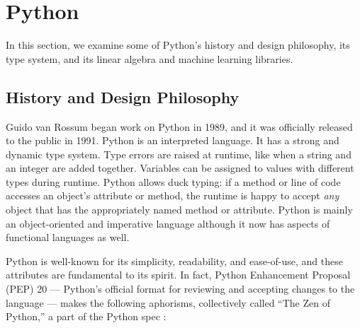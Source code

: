 \documentclass[12pt]{report}
\begin{document}
\section{Python}

In this section, we examine some of Python's history and design philosophy, its type system, and its linear algebra and machine learning libraries.

\subsection{History and Design Philosophy}

Guido van Rossum began work on Python in 1989, and it was officially released to the public in 1991. Python is an interpreted language. It has a strong and dynamic type system. Type errors are raised at runtime, like when a string and an integer are added together. Variables can be assigned to values with different types during runtime. Python allows duck typing: if a method or line of code accesses an object's attribute or method, the runtime is happy to accept \textit{any} object that has the appropriately named method or attribute. Python is mainly an object-oriented and imperative language although it now has aspects of functional languages as well.

Python is well-known for its simplicity, readability, and ease-of-use, and these attributes are fundamental to its spirit. In fact, Python Enhancement Proposal (PEP) 20 --- Python's official format for reviewing and accepting changes to the language --- makes the following aphorisms, collectively called ``The Zen of Python,'' a part of the Python spec \cite{pep20}:
\end{document}
